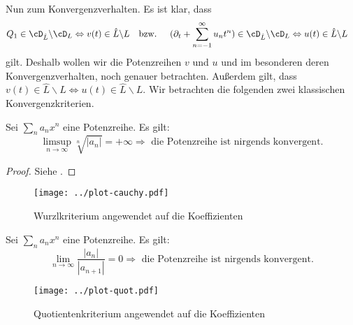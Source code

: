 Nun zum Konvergenzverhalten. Es ist klar, dass
\begin{align*}
Q_1\in\cD_{\hat L} \backslash\cD_L &\Leftrightarrow v(t) \in\hat L \backslash L
&\mbox{bzw. } & &
(\partial_t + \sum_{n=-1}^\infty u_nt^n)\in \cD_{\hat L} \backslash \cD_L
&\Leftrightarrow u(t) \in \hat L \backslash L
\end{align*}
gilt. Deshalb wollen wir die Potenzreihen $v$ und $u$ und im besonderen deren
Konvergenzverhalten, noch genauer betrachten.
Außerdem gilt, dass $ v(t) \in\hat L \backslash L \Leftrightarrow u(t) \in \hat
L \backslash L$.
Wir betrachten die folgenden zwei klassischen Konvergenzkriterien.
\begin{thm} \label{thm:convKrit}
Sei $\sum_n a_n x^n$ eine Potenzreihe. Es gilt:
\[
\underset{n\rightarrow\infty}{\limsup} \sqrt[n]{|a_n|} = +\infty
\Rightarrow \text{ die Potenzreihe ist nirgends konvergent.}
\]
\end{thm}
\begin{proof}
Siehe \cite[§18, Satz 94]{KnoppReihen}.
\end{proof}
\begin{figure}[htbp]
  \centering
  \texttt{[image: ../plot-cauchy.pdf]}
  \caption{Wurzlkriterium angewendet auf die Koeffizienten}
  \label{fig:plotCauchyKoeffs}
\end{figure}
\begin{thm}[Quotientenkriterium]
Sei $\sum_n a_n x^n$ eine Potenzreihe. Es gilt:
\[
\underset{n\rightarrow\infty}{\lim} \frac{|a_{n}|}{|a_{n+1}|} = 0
\Rightarrow \text{ die Potenzreihe ist nirgends konvergent.}
\]
\end{thm}
\begin{comment}
\begin{proof}
Es gilt, dass $\sum_na_nx^n$ für ein $x\in\C$ konvergent ist, falls
\[
\exists N\in\N:\forall n>N:\left|\frac{a_{n+1}x^{n+1}}{a_nx^n}\right|\leq\eta<1
\]
und das ist äquivalent zu
\[
\underset{n\rightarrow\infty}{\limsup} \left|\frac{a_{n+1}}{a_n}\right||x| < 1 \,.
\]
Also konvergiert die Reihe für alle $x$ mit
$|x|<\underset{n\rightarrow\infty}{\lim} \left|\frac{a_{n+1}}{a_n}\right|$.
\end{proof}
\end{comment}
\begin{figure}[htbp]
  \centering
  \texttt{[image: ../plot-quot.pdf]}
  \caption{Quotientenkriterium angewendet auf die Koeffizienten}
  \label{fig:plotQuotKoeffs}
\end{figure}

